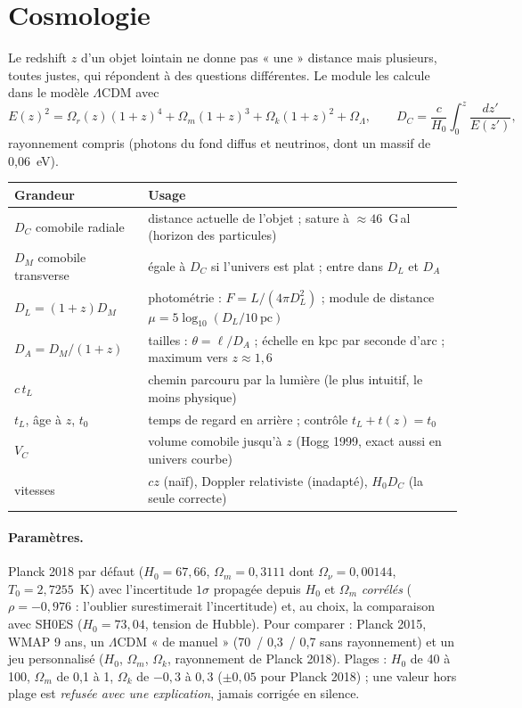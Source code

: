\section{Cosmologie}\label{sec:cosmo}
Le redshift $z$ d'un objet lointain ne donne pas « une » distance mais plusieurs, toutes justes, qui répondent à des
questions différentes. Le module les calcule dans le modèle $\Lambda$CDM avec
\[ E(z)^2 = \Omega_r(z)(1+z)^4 + \Omega_m(1+z)^3 + \Omega_k(1+z)^2 + \Omega_\Lambda, \qquad
   D_C = \frac{c}{H_0}\int_0^z\frac{dz'}{E(z')}, \]
rayonnement compris (photons du fond diffus et neutrinos, dont un massif de 0,06~eV).
\begin{center}
\begin{tabularx}{\linewidth}{@{}lX@{}}
\toprule
Grandeur & Usage \\
\midrule
$D_C$ comobile radiale & distance actuelle de l'objet ; sature à $\approx 46$~G\,al (horizon des particules)\\
$D_M$ comobile transverse & égale à $D_C$ si l'univers est plat ; entre dans $D_L$ et $D_A$\\
$D_L = (1+z)D_M$ & photométrie : $F = L/(4\pi D_L^2)$ ; module de distance $\mu = 5\log_{10}(D_L/10~\mathrm{pc})$\\
$D_A = D_M/(1+z)$ & tailles : $\theta = \ell/D_A$ ; échelle en kpc par seconde d'arc ; maximum vers $z\approx1{,}6$\\
$c\,t_L$ & chemin parcouru par la lumière (le plus intuitif, le moins physique)\\
$t_L$, âge à $z$, $t_0$ & temps de regard en arrière ; contrôle $t_L + t(z) = t_0$\\
$V_C$ & volume comobile jusqu'à $z$ (Hogg 1999, exact aussi en univers courbe)\\
vitesses & $cz$ (naïf), Doppler relativiste (inadapté), $H_0 D_C$ (la seule correcte)\\
\bottomrule
\end{tabularx}
\end{center}

\paragraph{Paramètres.} Planck 2018 par défaut ($H_0 = 67{,}66$, $\Omega_m = 0{,}3111$ dont $\Omega_\nu = 0{,}00144$,
$T_0 = 2{,}7255$~K) avec l'incertitude $1\sigma$ propagée depuis $H_0$ et $\Omega_m$ \emph{corrélés}
($\rho = -0{,}976$ : l'oublier surestimerait l'incertitude) et, au choix, la comparaison avec SH0ES
($H_0 = 73{,}04$, tension de Hubble). Pour comparer : Planck 2015, WMAP 9 ans, un $\Lambda$CDM « de manuel »
(70~/ 0,3~/ 0,7 sans rayonnement) et un jeu personnalisé ($H_0$, $\Omega_m$, $\Omega_k$, rayonnement de Planck 2018).
Plages : $H_0$ de 40 à 100, $\Omega_m$ de 0,1 à 1, $\Omega_k$ de $-0{,}3$ à $0{,}3$ ($\pm 0{,}05$ pour Planck 2018) ;
une valeur hors plage est \emph{refusée avec une explication}, jamais corrigée en silence.

